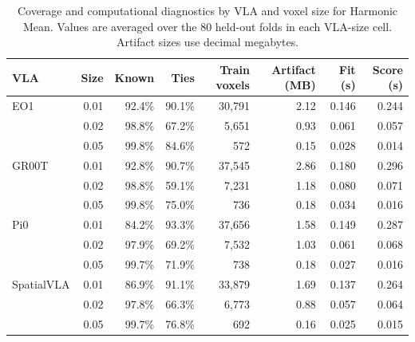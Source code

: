 \begin{table}[t]
\centering
\caption{Coverage and computational diagnostics by VLA and voxel size for Harmonic Mean. Values are averaged over the 80 held-out folds in each VLA-size cell. Artifact sizes use decimal megabytes.}
\label{tab:rq2-diagnostics-by-vla}
{\scriptsize
\setlength{\tabcolsep}{4pt}
\begin{tabular}{lrrrrrrr}
\toprule
VLA & Size & Known & Ties & Train voxels & Artifact (MB) & Fit (s) & Score (s) \\
\midrule
EO1 & 0.01 & 92.4\% & 90.1\% & 30,791 & 2.12 & 0.146 & 0.244 \\
 & 0.02 & 98.8\% & 67.2\% & 5,651 & 0.93 & 0.061 & 0.057 \\
 & 0.05 & 99.8\% & 84.6\% & 572 & 0.15 & 0.028 & 0.014 \\
\midrule
GR00T & 0.01 & 92.8\% & 90.7\% & 37,545 & 2.86 & 0.180 & 0.296 \\
 & 0.02 & 98.8\% & 59.1\% & 7,231 & 1.18 & 0.080 & 0.071 \\
 & 0.05 & 99.8\% & 75.0\% & 736 & 0.18 & 0.034 & 0.016 \\
\midrule
Pi0 & 0.01 & 84.2\% & 93.3\% & 37,656 & 1.58 & 0.149 & 0.287 \\
 & 0.02 & 97.9\% & 69.2\% & 7,532 & 1.03 & 0.061 & 0.068 \\
 & 0.05 & 99.7\% & 71.9\% & 738 & 0.18 & 0.027 & 0.016 \\
\midrule
SpatialVLA & 0.01 & 86.9\% & 91.1\% & 33,879 & 1.69 & 0.137 & 0.264 \\
 & 0.02 & 97.8\% & 66.3\% & 6,773 & 0.88 & 0.057 & 0.064 \\
 & 0.05 & 99.7\% & 76.8\% & 692 & 0.16 & 0.025 & 0.015 \\
\bottomrule
\end{tabular}
}
\end{table}
